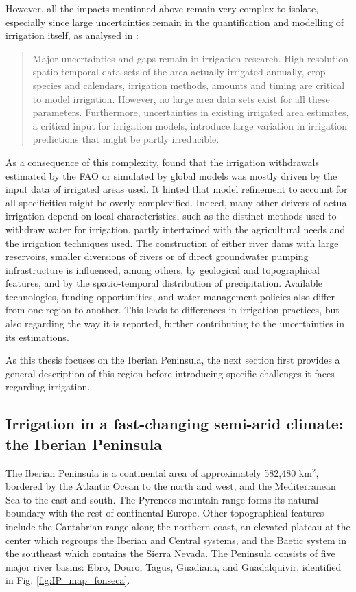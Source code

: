 However, all the impacts mentioned above remain very complex to isolate, especially since large uncertainties remain in the quantification and modelling of irrigation itself, as analysed in \citet{mcdermid_irrigation_2023}:
\begin{quote}
    Major uncertainties and gaps remain in irrigation research. High-resolution spatio-temporal data sets of the area actually irrigated annually, crop species and calendars, irrigation methods, amounts and timing are critical to model irrigation. However, no large area data sets exist for all these parameters. Furthermore, uncertainties in existing irrigated area estimates, a critical input for irrigation models, introduce large variation in irrigation predictions that might be partly irreducible.
\end{quote}
As a consequence of this complexity, \citet{puy_irrigated_2021} found that the irrigation withdrawals estimated by the FAO or simulated by global models was mostly driven by the input data of irrigated areas used. It hinted that model refinement to account for all specificities might be overly complexified.
Indeed, many other drivers of actual irrigation depend on local characteristics, such as the distinct methods used to withdraw water for irrigation, partly intertwined with the agricultural needs and the irrigation techniques used. 
The construction of either river dams with large reservoirs, smaller diversions of rivers or of direct groundwater pumping infrastructure is influenced, among others, by geological and topographical features, and by the spatio-temporal distribution of precipitation. Available technologies, funding opportunities, and water management policies also differ from one region to another. This leads to differences in irrigation practices, but also regarding the way it is reported, further contributing to the uncertainties in its estimations.

As this thesis focuses on the Iberian Peninsula, the next section first provides a general description of this region before introducing specific challenges it faces regarding irrigation.

\subsection{Irrigation in a fast-changing semi-arid climate: the Iberian Peninsula}
The Iberian Peninsula is a continental area of approximately 582,480 km$^2$, bordered by the Atlantic Ocean to the north and west, and the Mediterranean Sea to the east and south. The Pyrenees mountain range forms its natural boundary with the rest of continental Europe. Other topographical features include the Cantabrian range along the northern coast, an elevated plateau at the center which regroups the Iberian and Central systems, and the Baetic system in the southeast which contains the Sierra Nevada.
The Peninsula consists of five major river basins: Ebro, Douro, Tagus, Guadiana, and Guadalquivir, identified in Fig. \ref{fig:IP_map_fonseca}.

